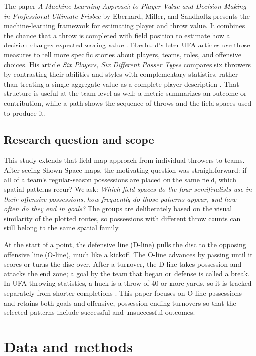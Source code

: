 \documentclass[11pt]{article}
\begin{document}
The paper \emph{A Machine Learning Approach to Player Value and Decision Making
in Professional Ultimate Frisbee} by Eberhard, Miller, and Sandholtz presents the
machine-learning framework for estimating player and throw value. It combines the
chance that a throw is completed with field position to estimate how a decision
changes expected scoring value \citep{eberhard2025sloan}. Eberhard's later UFA
articles use those measures to tell more specific stories about players, teams,
roles, and offensive choices. His article \emph{Six Players, Six Different
Passer Types} compares six throwers by contrasting their abilities and styles
with complementary statistics, rather than treating a single aggregate value as
a complete player description \citep{eberhard2026passers}. That structure is
useful at the team level as well: a metric summarizes an outcome or contribution,
while a path shows the sequence of throws and the field spaces used to produce it.

\subsection{Research question and scope}

This study extends that field-map approach from individual throwers to teams.
After seeing Shown Space maps, the motivating question was straightforward:
if all of a team's regular-season possessions are placed on the same field, which
spatial patterns recur? We ask: \emph{Which field spaces do the four semifinalists
use in their offensive possessions, how frequently do those patterns
appear, and how often do they end in goals?} The groups are deliberately based on
the visual similarity of the plotted routes, so possessions with different throw
counts can still belong to the same spatial family.

At the start of a point, the defensive line (D-line) pulls the disc to the
opposing offensive line (O-line), much like a kickoff. The O-line advances by
passing until it scores or turns the disc over. After a turnover, the D-line
takes possession and attacks the end zone; a goal by the team that began on
defense is called a break. In UFA throwing statistics, a huck is a throw of 40
or more yards, so it is tracked separately from shorter completions
\citep{cohen2024throwerstats}. This paper focuses on O-line possessions and
retains both goals and offensive, possession-ending turnovers so that the
selected patterns include successful and unsuccessful outcomes.

\section{Data and methods}
\end{document}
